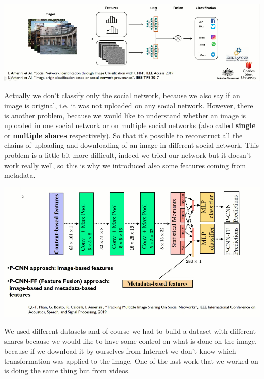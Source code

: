 \documentclass[11pt]{article}
\begin{document}
\begin{center}
\includegraphics[scale=0.5]{./images/FusionNET.png}
\end{center}

Actually we don't classify only the social network, because we also say if an image is original, i.e. it was not uploaded on any social network. However, there is another problem, because we would like to understand whether an image is uploaded in one social network or on multiple social networks (also called \textbf{single} or \textbf{multiple shares} respectively). So that it's possible to reconstruct all the chains of uploading and downloading of an image in different social network. This problem is a little bit more difficult, indeed we tried our network but it doesn't work really well, so this is why we introduced also some features coming from metadata.

\begin{center}
\includegraphics[scale=0.5]{./images/FusionNET_image_features_and_metadata.png}
\end{center}

We used different datasets and of course we had to build a dataset with different shares because we would like to have some control on what is done on the image, because if we download it by ourselves from Internet we don't know which transformation was applied to the image. One of the last work that we worked on is doing the same thing but from videos.
\end{document}
